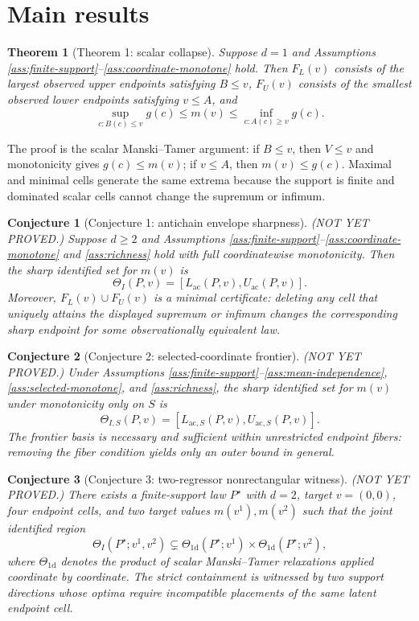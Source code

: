 \documentclass[11pt]{article}
\theoremstyle{definition}
\theoremstyle{plain}
\newtheorem{theorem}{Theorem}
\newtheorem{conjecture}{Conjecture}
\theoremstyle{remark}
\begin{document}
\section{Main results}
\begin{theorem}[Theorem 1: scalar collapse]\label{thm:scalar-collapse}
Suppose \(d=1\) and Assumptions \ref{ass:finite-support}--\ref{ass:coordinate-monotone} hold.  Then \(F_L(v)\) consists of the largest observed upper endpoints satisfying \(B\le v\), \(F_U(v)\) consists of the smallest observed lower endpoints satisfying \(v\le A\), and
\[
\sup_{c:B(c)\le v} g(c)\le m(v)\le \inf_{c:A(c)\ge v}g(c).
\]
\end{theorem}
The proof is the scalar Manski--Tamer argument: if \(B\le v\), then \(V\le v\) and monotonicity gives \(g(c)\le m(v)\); if \(v\le A\), then \(m(v)\le g(c)\).  Maximal and minimal cells generate the same extrema because the support is finite and dominated scalar cells cannot change the supremum or infimum.

\begin{conjecture}[Conjecture 1: antichain envelope sharpness]\label{conj:antichain-sharp}
(NOT YET PROVED.)  Suppose \(d\ge2\) and Assumptions \ref{ass:finite-support}--\ref{ass:coordinate-monotone} and \ref{ass:richness} hold with full coordinatewise monotonicity.  Then the sharp identified set for \(m(v)\) is
\[
\Theta_I(P,v)=[L_{\mathrm{ac}}(P,v),U_{\mathrm{ac}}(P,v)].
\]
Moreover, \(F_L(v)\cup F_U(v)\) is a minimal certificate: deleting any cell that uniquely attains the displayed supremum or infimum changes the corresponding sharp endpoint for some observationally equivalent law.
\end{conjecture}

\begin{conjecture}[Conjecture 2: selected-coordinate frontier]\label{conj:selected}
(NOT YET PROVED.)  Under Assumptions \ref{ass:finite-support}--\ref{ass:mean-independence}, \ref{ass:selected-monotone}, and \ref{ass:richness}, the sharp identified set for \(m(v)\) under monotonicity only on \(S\) is
\[
\Theta_{I,S}(P,v)=[L_{\mathrm{ac},S}(P,v),U_{\mathrm{ac},S}(P,v)].
\]
The frontier basis is necessary and sufficient within unrestricted endpoint fibers: removing the fiber condition yields only an outer bound in general.
\end{conjecture}

\begin{conjecture}[Conjecture 3: two-regressor nonrectangular witness]\label{conj:nonrectangular}
(NOT YET PROVED.)  There exists a finite-support law \(P^\star\) with \(d=2\), target \(v=(0,0)\), four endpoint cells, and two target values \(m(v^1),m(v^2)\) such that the joint identified region
\[
\Theta_I(P^\star;v^1,v^2)\subsetneq
\Theta_{1\mathrm{d}}(P^\star;v^1)\times \Theta_{1\mathrm{d}}(P^\star;v^2),
\]
where \(\Theta_{1\mathrm{d}}\) denotes the product of scalar Manski--Tamer relaxations applied coordinate by coordinate.  The strict containment is witnessed by two support directions whose optima require incompatible placements of the same latent endpoint cell.
\end{conjecture}
\end{document}
